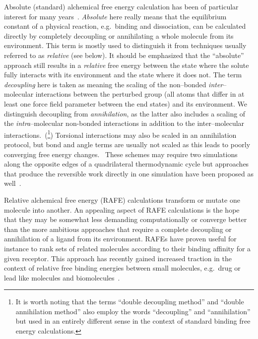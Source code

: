 \documentclass[journal=jctcce,manuscript=article]{achemso}
\begin{document}
Absolute (standard) alchemical free energy calculation has been of
particular interest for many years~\cite{GILSON19971047,
  doi:10.1021/jp0217839, deng_computations_2009, ytreberg_comparison_2006, doi:10.1021/ct500964e, jorgensen1988efficient}.  \emph{Absolute}
here really means that the equilibrium constant of a physical
reaction, e.g.\ binding and dissociation, can be calculated directly
by completely decoupling or annihilating a whole molecule from its environment.
This term is mostly used to distinguish it from techniques usually
referred to as \emph{relative} (see below).  It should be emphasized that the
``absolute'' approach still results in a \emph{relative} free energy
between the state where the solute fully interacts with its environment and the state where it does
not.
The term \emph{decoupling} here is taken as meaning the scaling of the non--bonded \emph{inter}--molecular interactions between the perturbed group (all atoms
that differ in at least one force field parameter between the end states) and
its environment.  We distinguish decoupling from \emph{annihilation},
as the latter also includes a scaling of
the \emph{intra}--molecular non-bonded interactions in addition to the
inter--molecular interactions.~\cite{shirtsmobleyreview_2013}(\footnote{It is worth noting that the terms ``double decoupling method'' and ``double annihilation method'' also employ the words ``decoupling'' and ``annihilation'' but used in an entirely different sense in the context of standard binding free energy calculations.})
Torsional interactions may also be scaled in an annihilation protocol, but bond and angle terms are usually not scaled as this leads to poorly converging free energy changes.~\cite{doi:10.1021/jp981628n}
These schemes may require two
simulations along the opposite edges of a quadrilateral thermodynamic cycle
but approaches that produce the reversible work directly in one simulation
have been proposed as well~\cite{doi:10.1063/1.3519057, C3FD00125C}.

Relative alchemical free energy (RAFE) calculations transform or
mutate one molecule into another.  An appealing aspect of RAFE
calculations is the hope that they may be somewhat less demanding
computationally or converge better than the more ambitious approaches
that require a complete decoupling or annihilation of a ligand from
its environment.  RAFEs have proven useful for instance to rank sets
of related molecules according to their binding affinity for a given
receptor. This approach has recently gained increased traction in the
context of relative free binding energies between small molecules,
e.g.\ drug or lead like molecules and
biomolecules~\cite{christ_accuracy_2013, doi:10.1021/ci5004027,
  doi:10.1021/ja512751q, doi:10.1021/acs.jctc.6b00991}.
\end{document}
